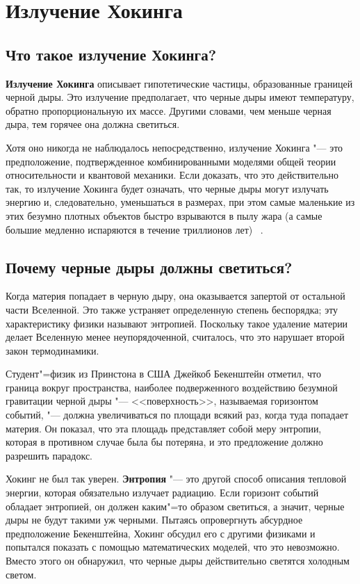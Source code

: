 \documentclass[bachelor, och, referat]{SCWorks}
\begin{document}
\section{Излучение Хокинга}
\subsection{Что такое излучение Хокинга?}

\textbf{Излучение Хокинга} описывает гипотетические частицы, образованные границей черной дыры. Это излучение предполагает, что черные дыры имеют температуру, обратно пропорциональную их массе. Другими словами, чем меньше черная дыра, тем горячее она должна светиться.

Хотя оно никогда не наблюдалось непосредственно, излучение Хокинга "--- это предположение, подтвержденное комбинированными моделями общей теории относительности и квантовой механики. Если доказать, что это действительно так, то излучение Хокинга будет означать, что черные дыры могут излучать энергию и, следовательно, уменьшаться в размерах, при этом самые маленькие из этих безумно плотных объектов быстро взрываются в пылу жара (а самые большие медленно испаряются в течение триллионов лет) ~\cite{3}.

\subsection{Почему черные дыры должны светиться?}

Когда материя попадает в черную дыру, она оказывается запертой от остальной части Вселенной. Это также устраняет определенную степень беспорядка; эту характеристику физики называют энтропией. Поскольку такое удаление материи делает Вселенную менее неупорядоченной, считалось, что это нарушает второй закон термодинамики.

Студент"=физик из Принстона в США Джейкоб Бекенштейн отметил, что граница вокруг пространства, наиболее подверженного воздействию безумной гравитации черной дыры "--- <<поверхность>>, называемая горизонтом событий, "--- должна увеличиваться по площади всякий раз, когда туда попадает материя. Он показал, что эта площадь представляет собой меру энтропии, которая в противном случае была бы потеряна, и это предложение должно разрешить парадокс.

Хокинг не был так уверен. \textbf{Энтропия} "--- это другой способ описания тепловой энергии, которая обязательно излучает радиацию. Если горизонт событий обладает энтропией, он должен каким"=то образом светиться, а значит, черные дыры не будут такими уж черными. Пытаясь опровергнуть абсурдное предположение Бекенштейна, Хокинг обсудил его с другими физиками и попытался показать с помощью математических моделей, что это невозможно. Вместо этого он обнаружил, что черные дыры действительно светятся холодным светом.
\end{document}
